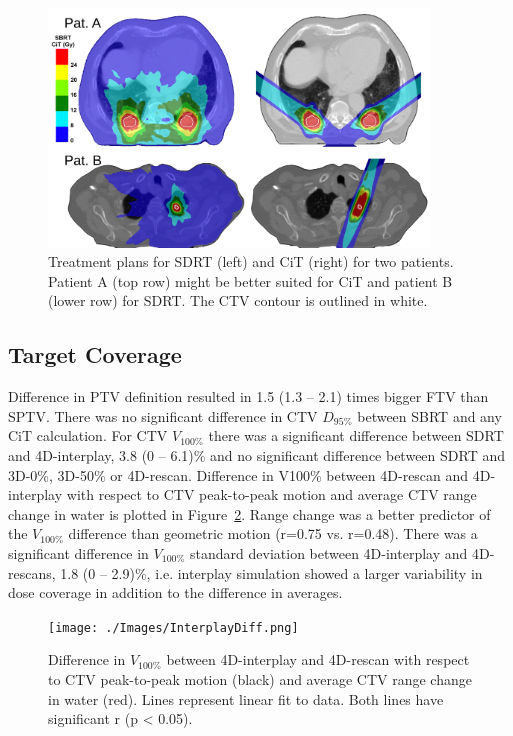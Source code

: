 \documentclass[type=dr, dr=rernat, acm$^3$entcolor=tud7b,colorbacktitle, bigchapter, openright, twoside, 12pt ]{tudthesis}
\begin{document}
\begin{figure}[H]
\begin{center}
\includegraphics[width=0.9\textwidth]{./Images/TreatmentPlans.png}
\caption{Treatment plans for SDRT (left) and CiT (right) for two patients. 
Patient A (top row) might be better suited for CiT and patient B (lower row) for SDRT. The CTV contour is outlined in white.}
\label{Fig:TreatmentPlans}
\end{center}
\end{figure}

\subsection{Target Coverage}

Difference in PTV definition resulted in 1.5 (1.3 – 2.1) times bigger FTV than SPTV. There was no significant difference in CTV $D_{95\%}$ between SBRT and any CiT calculation. 
For CTV $V_{100\%}$ there was a significant difference between SDRT and 4D-interplay, 3.8 (0 – 6.1)\% and no significant difference between SDRT and 3D-0\%, 3D-50\% or 4D-rescan. 
Difference in V100\% between 4D-rescan and 4D-interplay with respect to CTV peak-to-peak motion and average CTV range change in water is plotted in Figure~\ref{Fig:InterplayDiff}. Range change was a 
better predictor of the  $V_{100\%}$ difference than geometric motion (r=0.75 vs. r=0.48).
There was a significant difference in  $V_{100\%}$ standard deviation between 4D-interplay and 4D-rescans, 1.8 (0 – 2.9)\%, i.e. interplay simulation showed a larger variability in dose coverage in addition to the difference in averages.

\begin{figure}[H]
\begin{center}
\texttt{[image: ./Images/InterplayDiff.png]}
\caption{Difference in $V_{100\%}$  between 4D-interplay and 4D-rescan 
with respect to CTV peak-to-peak motion (black) and average CTV range 
change in water (red). Lines represent linear fit to data. Both lines have significant r (p < 0.05).}
\label{Fig:InterplayDiff}
\end{center}
\end{figure}
\end{document}
